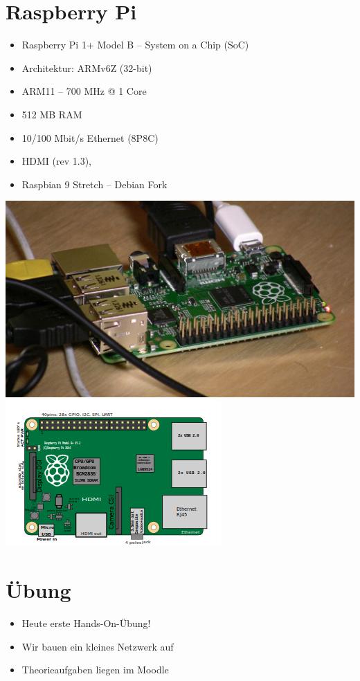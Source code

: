 \documentclass[xcolor=dvipsnames]{beamer}
\begin{document}
\section{Raspberry Pi}
\begin{frame}
 \hspace*{-1cm}
\begin{minipage}{0.7\textwidth}
\begin{itemize}
	\item Raspberry Pi 1+ Model B -- System on a Chip (SoC)
	\item Architektur: ARMv6Z (32-bit)
	\item  ARM11 -- 700 MHz @ 1 Core
	\item 512 MB RAM
	\item 10/100 Mbit/s Ethernet (8P8C)
	\item HDMI (rev 1.3),
	\item Raspbian 9 Stretch -- Debian Fork
\end{itemize}
\end{minipage}%
\begin{minipage}{0.3\textwidth}
\includegraphics[scale=0.07]{raspi}
\includegraphics[scale=0.45]{raspib1+}
\end{minipage}\hfill
\end{frame}

\section{Übung}
\begin{frame}
\begin{itemize}
	\item Heute erste Hands-On-Übung!
	\item Wir bauen ein kleines Netzwerk auf
	\item Theorieaufgaben liegen im Moodle
\end{itemize}
\end{frame}
\end{document}
